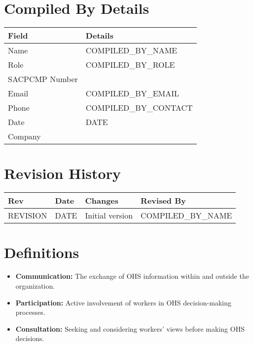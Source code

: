 \documentclass[11pt]{article}
\newcommand{\issueDate}{{{DATE}}}
\newcommand{\compilerName}{{{COMPILED_BY_NAME}}}
\newcommand{\compilerRole}{{{COMPILED_BY_ROLE}}}
\newcommand{\compilerSACPCMP}{}
\newcommand{\compilerEmail}{{{COMPILED_BY_EMAIL}}}
\newcommand{\compilerPhone}{{{COMPILED_BY_CONTACT}}}
\newcommand{\compilerCompany}{}
\newcommand{\revision}{{{REVISION}}}
\begin{document}
\section{Compiled By Details}
\begin{tabularx}{\textwidth}{lX}
  \toprule
  \textbf{Field} & \textbf{Details} \\
  \midrule
  Name & \compilerName \\
  Role & \compilerRole \\
  SACPCMP Number & \compilerSACPCMP \\
  Email & \compilerEmail \\
  Phone & \compilerPhone \\
  Date & \issueDate \\
  Company & \compilerCompany \\
  \bottomrule
\end{tabularx}

\section{Revision History}
\begin{tabularx}{\textwidth}{lXll}
  \toprule
  \textbf{Rev} & \textbf{Date} & \textbf{Changes} & \textbf{Revised By} \\
  \midrule
  \revision & \issueDate & Initial version & \compilerName \\
  \bottomrule
\end{tabularx}

\section{Definitions}
\begin{itemize}
    \item \textbf{Communication:} The exchange of OHS information within and outside the organization.
    \item \textbf{Participation:} Active involvement of workers in OHS decision-making processes.
    \item \textbf{Consultation:} Seeking and considering workers’ views before making OHS decisions.
\end{itemize}
\end{document}
